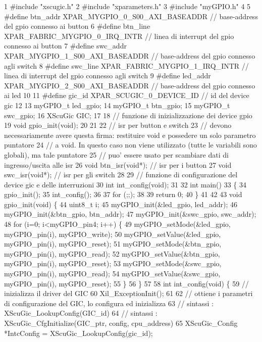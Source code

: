 \begin{DoxyCode}
1 #include "xscugic.h"
2 #include "xparameters.h"
3 #include "myGPIO.h"
4 
5 #define btn\_addr    XPAR\_MYGPIO\_0\_S00\_AXI\_BASEADDR  // base-address del gpio connesso ai button
6 #define btn\_line    XPAR\_FABRIC\_MYGPIO\_0\_IRQ\_INTR   // linea di interrupt del gpio connesso ai button
7 #define swc\_addr    XPAR\_MYGPIO\_1\_S00\_AXI\_BASEADDR  // base-address del gpio connesso agli switch
8 #define swc\_line    XPAR\_FABRIC\_MYGPIO\_1\_IRQ\_INTR   // linea di interrupt del gpio connesso agli switch
9 #define led\_addr    XPAR\_MYGPIO\_2\_S00\_AXI\_BASEADDR  // base-address del gpio connesso ai led
10 
11 #define gic\_id      XPAR\_SCUGIC\_0\_DEVICE\_ID         // id del device gic
12 
13 myGPIO\_t led\_gpio;
14 myGPIO\_t btn\_gpio;
15 myGPIO\_t swc\_gpio;
16 XScuGic GIC;
17 
18 // funzione di inizializzazione dei device gpio
19 void gpio\_init(void);
20 
21 
22 // isr per button e switch
23 // devono necessariamente avere questa firma: restituire void e possedere un solo parametro puntatore
24 // a void. In questo caso non viene utilizzato (tutte le variabili sono globali), ma tale puntatore
25 // puo' essere usato per scambiare dati di ingresso/uscita alle isr
26 void btn\_isr(void*); // isr per i button
27 void swc\_isr(void*); // isr per gli switch
28 
29 // funzione di configurazione del device gic e delle interruzioni
30 int int\_config(void);
31 
32 int main()
33 \{
34     gpio\_init();
35     int\_config();
36 
37     for (;;);
38 
39     return 0;
40 \}
41 
42 
43 void gpio\_init(void) \{
44     uint8\_t i;
45     myGPIO\_init(&led\_gpio, led\_addr);
46     myGPIO\_init(&btn\_gpio, btn\_addr);
47     myGPIO\_init(&swc\_gpio, swc\_addr);
48     for (i=0; i<myGPIO\_pin4; i++) \{
49         myGPIO\_setMode(&led\_gpio, myGPIO\_pin(i), myGPIO\_write);
50         myGPIO\_setValue(&led\_gpio, myGPIO\_pin(i), myGPIO\_reset);
51         myGPIO\_setMode(&btn\_gpio, myGPIO\_pin(i), myGPIO\_read);
52         myGPIO\_setValue(&btn\_gpio, myGPIO\_pin(i), myGPIO\_reset);
53         myGPIO\_setMode(&swc\_gpio, myGPIO\_pin(i), myGPIO\_read);
54         myGPIO\_setValue(&swc\_gpio, myGPIO\_pin(i), myGPIO\_reset);
55     \}
56 \}
57 
58 int int\_config(void) \{
59     // inizializza il driver del GIC
60     Xil\_ExceptionInit();
61 
62     // ottiene i parametri di configurazione del GIC, lo configura ed inizializza
63     // sintassi : XScuGic\_LookupConfig(GIC\_id)
64     // sintassi : XScuGic\_CfgInitialize(GIC\_ptr, config, cpu\_address)
65     XScuGic\_Config *IntcConfig = XScuGic\_LookupConfig(gic\_id);

\end{DoxyCode}
